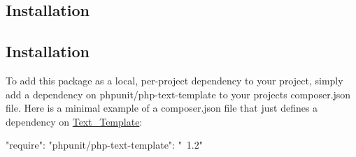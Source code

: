 \subsection*{Installation}

\subsection*{Installation}

To add this package as a local, per-\/project dependency to your project, simply add a dependency on {\ttfamily phpunit/php-\/text-\/template} to your project\textquotesingle{}s {\ttfamily composer.\+json} file. Here is a minimal example of a {\ttfamily composer.\+json} file that just defines a dependency on \mbox{\hyperlink{class_text___template}{Text\+\_\+\+Template}}\+: \begin{DoxyVerb}{
    "require": {
        "phpunit/php-text-template": "~1.2"
    }
}\end{DoxyVerb}
 